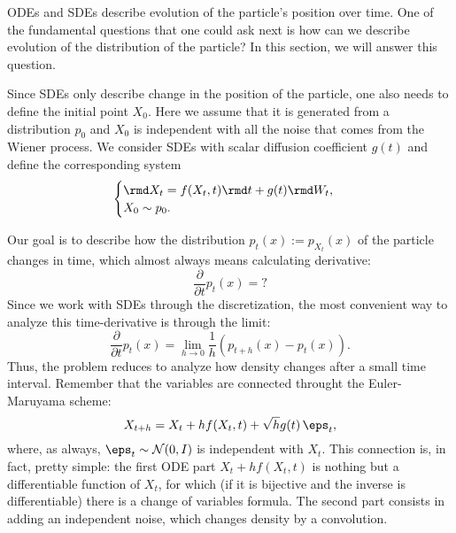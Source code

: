 ODEs and SDEs describe evolution of the particle's position over time. One of the fundamental questions that one could ask next is how can we describe evolution of the distribution of the particle? In this section, we will answer this question.

Since SDEs only describe change in the position of the particle, one also needs to define the initial point $X_0$. Here we assume that it is generated from a distribution $p_0$ and $X_0$ is independent with all the noise that comes from the Wiener process. We consider SDEs with scalar diffusion coefficient $g(t)$ and define the corresponding system
\begin{equation}\label{eq:sde_scalar}
    \begin{cases}
        \rmd X_t = f(X_t, t) \rmd t + g(t) \rmd W_t,\\
        X_0 \sim p_0.
    \end{cases}
\end{equation}

Our goal is to describe how the distribution $p_t(x) := p_{X_t}(x)$ of the particle changes in time, which almost always means calculating derivative:
\[
    \frac{\partial}{\partial t} p_t(x) = ?
\]
Since we work with SDEs through the discretization, the most convenient way to analyze this time-derivative is through the limit:
\[
    \frac{\partial}{\partial t} p_t(x) = \lim \limits_{h \rightarrow 0} \frac{1}{h}(p_{t + h}(x) - p_t(x)).
\]
Thus, the problem reduces to analyze how density changes after a small time interval. Remember that the variables are connected throught the Euler-Maruyama scheme:
\[
    X_{t + h} = X_t + hf(X_t, t) + \sqrt{h} g(t)\, \eps_t,
\]
where, as always, $\eps_t \sim \mathcal{N}(0, I)$ is independent with $X_t$. This connection is, in fact, pretty simple: the first ODE part $X_t + h f(X_t, t)$ is nothing but a differentiable function of $X_t$, for which (if it is bijective and the inverse is differentiable) there is a change of variables formula. The second part consists in adding an independent noise, which changes density by a convolution. 

